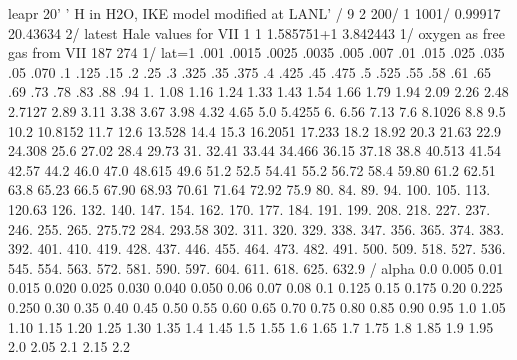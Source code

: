 \small
\begin{ccode}

leapr
20'
 ' H in H2O, IKE model modified at LANL'  /
 9 2 200/
 1 1001/
 0.99917 20.43634 2/  latest Hale values for VII
 1 1 1.585751+1 3.842443 1/   oxygen as free gas from VII
 187 274 1/  lat=1
     .001 .0015 .0025 .0035 .005 .007 .01 .015  .025 .035   .05  .070
     .1          .125      .15       .2        .25       .3        .325
     .35         .375      .4        .425      .45       .475      .5
     .525        .55       .58       .61       .65       .69       .73
     .78         .83       .88       .94       1.       1.08      1.16
    1.24        1.33      1.43      1.54       1.66     1.79      1.94
    2.09        2.26      2.48      2.7127     2.89     3.11      3.38
    3.67        3.98      4.32      4.65       5.0      5.4255    6.
    6.56        7.13      7.6       8.1026     8.8      9.5      10.2
   10.8152     11.7      12.6      13.528     14.4     15.3      16.2051
   17.233      18.2      18.92     20.3      21.63     22.9      24.308
   25.6        27.02     28.4      29.73     31.       32.41     33.44
   34.466      36.15     37.18     38.8      40.513    41.54     42.57
   44.2        46.0      47.0      48.615    49.6      51.2      52.5
   54.41       55.2      56.72     58.4      59.80     61.2      62.51
   63.8        65.23     66.5      67.90     68.93     70.61     71.64
   72.92       75.9      80.       84.       89.       94.      100.
  105.        113.      120.63    126.      132.      140.      147.
  154.        162.      170.      177.      184.      191.      199.
  208.        218.      227.      237.      246.      255.      265.
  275.72      284.      293.58    302.      311.      320.      329.
  338.        347.      356.      365.      374.      383.      392.
  401.        410.      419.      428.      437.      446.      455.
  464.        473.      482.      491.      500.      509.      518.
  527.        536.      545.      554.      563.      572.      581.
  590.        597.      604.      611.      618.      625.      632.9 / alpha
    0.0  0.005  0.01  0.015  0.020  0.025  0.030  0.040  0.050
    0.06  0.07  0.08 0.1  0.125
    0.15  0.175  0.20  0.225  0.250     0.30      0.35      0.40      0.45
    0.50        0.55      0.60      0.65      0.70      0.75      0.80
    0.85        0.90      0.95      1.0       1.05      1.10      1.15
    1.20        1.25      1.30      1.35      1.4       1.45      1.5
    1.55        1.6       1.65      1.7       1.75      1.8       1.85
    1.9         1.95      2.0       2.05      2.1       2.15      2.2

\end{ccode}
